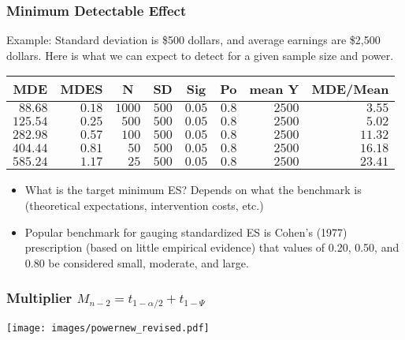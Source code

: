 \documentclass{beamer}
\numberwithin{equation}{section}
\begin{document}
\begin{frame}
  \frametitle{Minimum Detectable Effect}
  \small
Example: Standard deviation is \$500 dollars, and average earnings are \$2,500 dollars. Here is what we can expect to detect for a given sample size and power.
\begin{table}[!tbp]
 \begin{center}
 \begin{tabular}{rrrrrrrr}\hline\hline
\multicolumn{1}{c}{MDE}&\multicolumn{1}{c}{MDES}&\multicolumn{1}{c}{N}&\multicolumn{1}{c}{SD}&\multicolumn{1}{c}{Sig}&\multicolumn{1}{c}{Po}&\multicolumn{1}{c}{mean Y}&\multicolumn{1}{c}{MDE/Mean}\tabularnewline
\hline
$ 88.68$&$0.18$&$1000$&$500$&$0.05$&$0.8$&$2500$&$ 3.55$\tabularnewline
$125.54$&$0.25$&$ 500$&$500$&$0.05$&$0.8$&$2500$&$ 5.02$\tabularnewline
$282.98$&$0.57$&$ 100$&$500$&$0.05$&$0.8$&$2500$&$11.32$\tabularnewline
$404.44$&$0.81$&$  50$&$500$&$0.05$&$0.8$&$2500$&$16.18$\tabularnewline
$585.24$&$1.17$&$  25$&$500$&$0.05$&$0.8$&$2500$&$23.41$\tabularnewline
\hline
\end{tabular}
\end{center}
\end{table}

\begin{itemize}
  \item What is the target minimum ES? \pause Depends on what the benchmark is (theoretical expectations, intervention costs, etc.)
  \item Popular benchmark for gauging standardized ES is Cohen's (1977) prescription (based on little empirical evidence) that values of 0.20, 0.50, and 0.80 be
considered small, moderate, and large.
\end{itemize}

\end{frame}

\begin{frame}
  \frametitle{Multiplier $M_{n-2}=t_{1 - \alpha/2}+t_{1-\Psi}$}
  \begin{center}
  \texttt{[image: images/powernew\_revised.pdf]}
  \end{center}
\end{frame}
\end{document}
